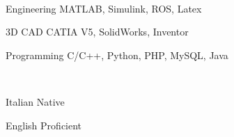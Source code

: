 \vspace{-\acvSectionTopSkip}

\begin{minipage}[t]{0.60\textwidth}

  \\

  \begin{cvskills}

    \cvskill
    {Engineering }
    {MATLAB, Simulink, ROS, Latex}

    \cvskill
    {3D CAD }
    {CATIA V5, SolidWorks, Inventor}

    \cvskill
    {Programming }
    {C/C++, Python, PHP, MySQL, Java}

  \end{cvskills}

\end{minipage}
%
\hfill
%
\begin{minipage}[t]{0.35\textwidth}

  \\

  \begin{cvskills}

    \cvskill
    {Italian}
    {Native}

    \cvskill
    {English}
    {Proficient}


  \end{cvskills}

\end{minipage}

